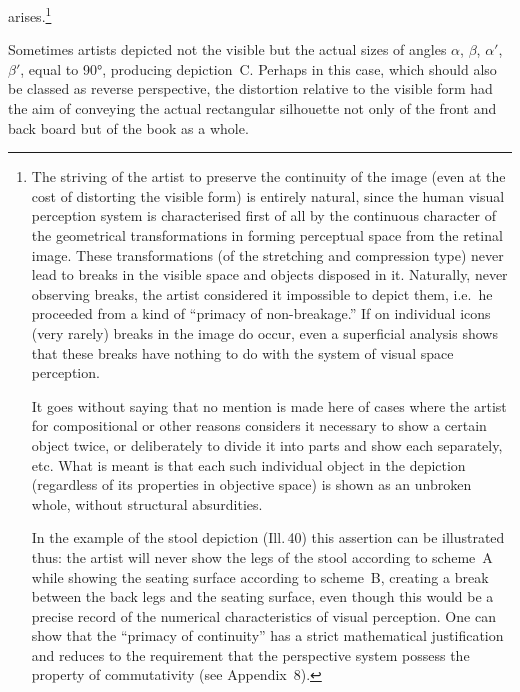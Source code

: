 arises.\footnote{The striving of the artist to preserve the continuity of the image
  (even at the cost of distorting the visible form) is entirely natural, since the
  human visual perception system is characterised first of all by the continuous
  character of the geometrical transformations in forming perceptual space from the
  retinal image.  These transformations (of the stretching and compression type) never
  lead to breaks in the visible space and objects disposed in it.  Naturally, never
  observing breaks, the artist considered it impossible to depict them, i.e.\ he
  proceeded from a kind of ``primacy of non-breakage.''  If on individual icons (very
  rarely) breaks in the image do occur, even a superficial analysis shows that these
  breaks have nothing to do with the system of visual space perception.

  It goes without saying that no mention is made here of cases where the artist for
  compositional or other reasons considers it necessary to show a certain object
  twice, or deliberately to divide it into parts and show each separately, etc.  What
  is meant is that each such individual object in the depiction (regardless of its
  properties in objective space) is shown as an unbroken whole, without structural
  absurdities.

  In the example of the stool depiction (Ill.\,40) this assertion can be illustrated
  thus: the artist will never show the legs of the stool according to scheme~A while
  showing the seating surface according to scheme~B, creating a break between the back
  legs and the seating surface, even though this would be a precise record of the
  numerical characteristics of visual perception.  One can show that the ``primacy of
  continuity'' has a strict mathematical justification and reduces to the requirement
  that the perspective system possess the property of commutativity (see
  Appendix~8).}


Sometimes artists depicted not the visible but the actual sizes of angles $\alpha$,
$\beta$, $\alpha'$, $\beta'$, equal to 90°, producing depiction~C.  Perhaps in this
case, which should also be classed as reverse perspective, the distortion relative to
the visible form had the aim of conveying the actual rectangular silhouette not only
of the front and back board but of the book as a whole.


